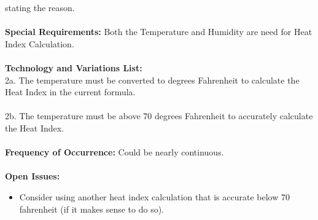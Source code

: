 \documentclass[letterpaper]{article}
\begin{document}
stating the reason.\\\\
\textbf{Special Requirements:  }Both the Temperature and Humidity are
need for Heat Index Calculation.\\\\
\textbf{Technology and Variations List:  }\\ 
2a.  The temperature must be converted to degrees Fahrenheit to
calculate the Heat Index in the current formula.\\\\
2b.  The temperature must be above 70 degrees Fahrenheit to
accurately calculate the Heat Index.\\\\
\textbf{Frequency of Occurrence:  }Could be nearly continuous.\\\\
\textbf{Open Issues:  }
\begin{itemize}
\item Consider using another heat index calculation that is accurate
below 70 fahrenheit (if it makes sense to do so).
\end{itemize}
\end{document}
